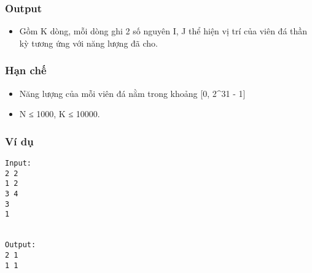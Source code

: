 \subsubsection{   Output  }
\begin{itemize}
	\item     Gồm K dòng, mỗi dòng ghi 2 số nguyên I, J thể hiện vị trí của viên đá thần kỳ tương ứng với năng lượng đã cho.   
\end{itemize}

\subsubsection{   Hạn chế  }
\begin{itemize}
	\item     Năng lượng của mỗi viên đá nằm trong khoảng [0, 2^31 - 1]   
	\item     N ≤ 1000, K ≤ 10000.   
\end{itemize}

\subsubsection{   Ví dụ  }
\begin{verbatim}
Input:
2 2
1 2
3 4
3
1


Output:
2 1
1 1

\end{verbatim}
